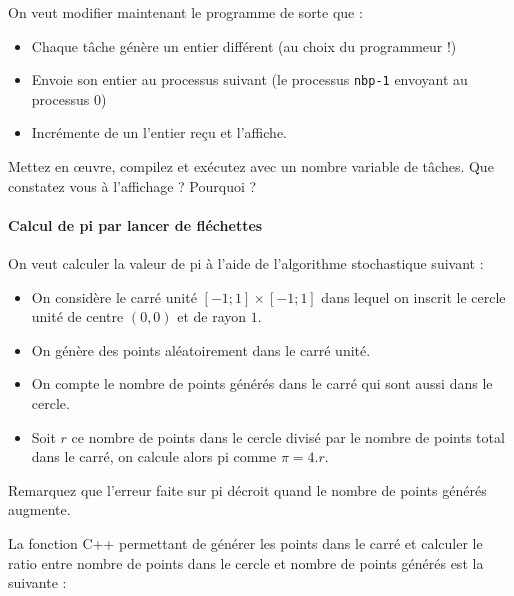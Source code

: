 \documentclass[11pt,a4paper]{article}
\begin{document}
On veut modifier maintenant le programme de sorte que :
\begin{itemize}
  \item Chaque tâche génère un entier différent (au choix du programmeur !)
  \item Envoie son entier au processus suivant (le processus \texttt{nbp-1} envoyant au processus 0)
  \item Incrémente de un l'entier reçu et l'affiche.
\end{itemize}

Mettez en {\oe}uvre, compilez et exécutez avec un nombre variable de tâches. Que constatez vous à l'affichage ?
Pourquoi ?

\paragraph{Calcul de pi par lancer de fléchettes}

On veut calculer la valeur de pi à l'aide de l'algorithme stochastique suivant :
\begin{itemize}
\item On considère le carré unité
$\left[-1;1\right]\times \left[-1;1\right]$ dans lequel on inscrit le cercle unité de centre $(0,0)$ et de rayon $1$.
\item On génère des points aléatoirement dans le carré unité.
\item On compte le nombre de points générés dans le carré qui sont aussi dans le cercle.
\item Soit $r$ ce nombre de points dans le cercle divisé par le nombre de points
  total dans le carré, on calcule alors pi comme $\pi = 4.r$.
\end{itemize}

Remarquez que l'erreur faite sur pi décroit quand le nombre de points générés augmente.

\begin{center}
\end{center}

La fonction C++ permettant de générer les points dans le carré et calculer le ratio entre nombre
de points dans le cercle et nombre de points générés est la suivante :
\end{document}
